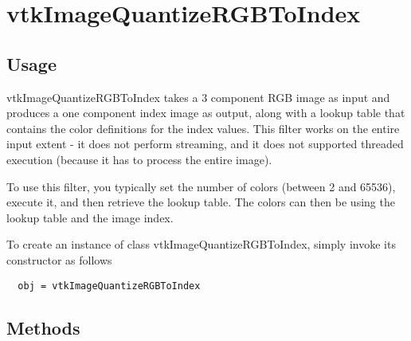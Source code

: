 \section{vtkImageQuantizeRGBToIndex}

\subsection{Usage}

 vtkImageQuantizeRGBToIndex takes a 3 component RGB image as
 input and produces a one component index image as output, along with
 a lookup table that contains the color definitions for the index values.
 This filter works on the entire input extent - it does not perform
 streaming, and it does not supported threaded execution (because it has
 to process the entire image).

 To use this filter, you typically set the number of colors 
 (between 2 and 65536), execute it, and then retrieve the lookup table.
 The colors can then be using the lookup table and the image index.

To create an instance of class vtkImageQuantizeRGBToIndex, simply
invoke its constructor as follows
\begin{verbatim}
  obj = vtkImageQuantizeRGBToIndex
\end{verbatim}
\subsection{Methods}

